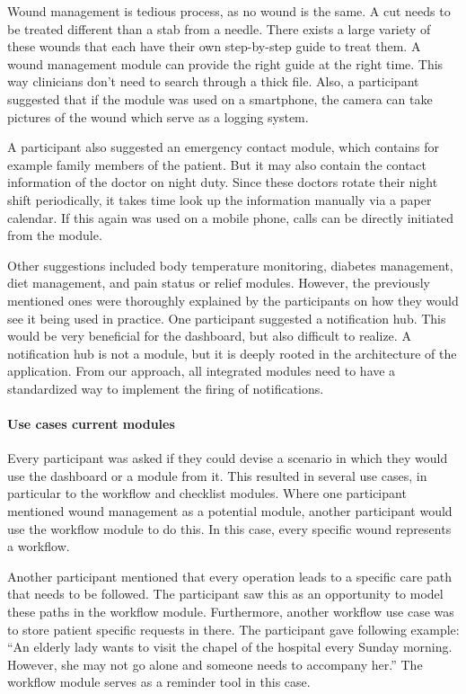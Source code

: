     Wound management is tedious process, as no wound is the same. A cut needs to be treated different than a stab from a needle. There exists a large variety of these wounds that each have their own step-by-step guide to treat them. A wound management module can provide the right guide at the right time. This way clinicians don't need to search through a thick file. Also, a participant suggested that if the module was used on a smartphone, the camera can take pictures of the wound which serve as a logging system.

    A participant also suggested an emergency contact module, which contains for example family members of the patient. But it may also contain the contact information of the doctor on night duty. Since these doctors rotate their night shift periodically, it takes time look up the information manually  via a paper calendar. If this again was used on a mobile phone, calls can be directly initiated from the module.

    Other suggestions included body temperature monitoring, diabetes management, diet management, and pain status or relief modules. However, the previously mentioned ones were thoroughly explained by the participants on how they would see it being used in practice. One participant suggested a notification hub. This would be very beneficial for the dashboard, but also difficult to realize. A notification hub is not a module, but it is deeply rooted in the architecture of the application. From our approach, all integrated modules need to have a standardized way to implement the firing of notifications.

    \paragraph{Use cases current modules}

    Every participant was asked if they could devise a scenario in which they would use the dashboard or a module from it. This resulted in several use cases, in particular to the workflow and checklist modules. Where one participant mentioned wound management as a potential module, another participant would use the workflow module to do this. In this case, every specific wound represents a workflow. 
    
    Another participant mentioned that every operation leads to a specific care path that needs to be followed. The participant saw this as an opportunity to model these paths in the workflow module. Furthermore, another workflow use case was to store patient specific requests in there. The participant gave following example: ``An elderly lady wants to visit the chapel of the hospital every Sunday morning. However, she may not go alone and someone needs to accompany her.'' The workflow module serves as a reminder tool in this case.

